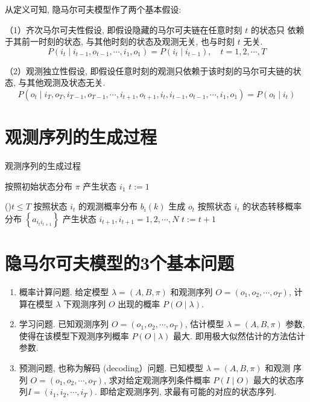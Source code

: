 从定义可知, 隐马尔可夫模型作了两个基本假设:

（1）齐次马尔可夫性假设, 即假设隐藏的马尔可夫链在任意时刻 $ t $ 的状态只 依赖于其前一时刻的状态, 与其他时刻的状态及观测无关, 也与时刻 $ t $ 无关.
$$
P\left(i_{t} \mid i_{t-1}, o_{t-1}, \cdots, i_{1}, o_{1}\right)=P\left(i_{t} \mid i_{t-1}\right), \quad t=1,2, \cdots, T
$$

（2）观测独立性假设, 即假设任意时刻的观测只依赖于该时刻的马尔可夫链的状态, 与其他观测及状态无关.
$$
P\left(o_{t} \mid i_{T}, o_{T}, i_{T-1}, o_{T-1}, \cdots, i_{t+1}, o_{t+1}, i_{t}, i_{t-1}, o_{t-1}, \cdots, i_{1}, o_{1}\right)=P\left(o_{t} \mid i_{t}\right)
$$

\section{观测序列的生成过程}

\begin{algorithm}[htbp]
    \caption{观测序列的生成过程}

    按照初始状态分布 $ \pi $ 产生状态 $ i_{1} $\;
    $ t:=1 $\;

    \While(){$t \le T$}{
        按照状态 $ i_{t} $ 的观测概率分布 $ b_{i}(k) $ 生成 $ o_{t} $\;
        按照状态 $ i_{t} $ 的状态转移概率分布 $ \left\{a_{i_{t} i_{t+1}}\right\} $ 产生状态 $ i_{t+1}, i_{t+1}=1,2, \cdots, N $\; 
        $t := t + 1$\;
    }
\end{algorithm}

\section{隐马尔可夫模型的3个基本问题}

\begin{enumerate}
    \item 概率计算问题. 给定模型 $ \lambda=(A, B, \pi) $ 和观测序列 $ O=\left(o_{1}, o_{2}, \cdots, o_{T}\right) $, 计 算在模型 $ \lambda $ 下观测序列 $ O $ 出现的概率 $ P(O \mid \lambda) $.
    \item 学习问题. 已知观测序列 $ O=\left(o_{1}, o_{2}, \cdots, o_{T}\right) $, 估计模型 $ \lambda=(A, B, \pi) $ 参数, 使得在该模型下观测序列概率 $ P(O \mid \lambda) $ 最大. 即用极大似然估计的方法估计参数.
    \item 预测问题, 也称为解码 (decoding）问题. 已知模型 $ \lambda=(A, B, \pi) $ 和观测 序列 $ O=\left(o_{1}, o_{2}, \cdots, o_{T}\right) $, 求对给定观测序列条件概率 $ P(I \mid O) $ 最大的状态序列$ I=\left(i_{1}, i_{2}, \cdots, i_{T}\right) $. 即给定观测序列, 求最有可能的对应的状态序列.
\end{enumerate}

